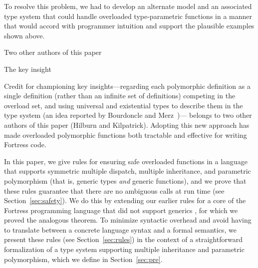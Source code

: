 To resolve this problem, 
we had to develop an alternate model 
and an associated type system 
that could handle overloaded type-parametric functions 
in a manner that would accord with programmer intuition 
and support the plausible examples shown above.

Two other authors of this paper 


The key insight 


Credit for championing key insights---regarding each polymorphic definition
as a single definition (rather than an infinite set of definitions)
competing in the overload set, and using universal and existential types
to describe them in the type system (an idea reported by
Bourdoncle and Merz~\cite{bourdoncle97})---%
belongs to two other authors of this paper (Hilburn and Kilpatrick).
Adopting this new approach has made
overloaded polymorphic functions both tractable and effective
for writing Fortress code.

In this paper, 
we give rules for ensuring safe overloaded functions 
in a language that supports symmetric multiple dispatch, 
multiple inheritance, and parametric polymorphism 
(that is, generic types \emph{and} generic functions),
and we prove that these rules guarantee 
that there are no ambiguous calls at run time 
(see Section~\ref{sec:safety}).
We do this by extending our earlier rules 
for a core of the Fortress programming language 
that did not support generics \cite{allen07,Fortress},
for which we proved the analogous theorem.
To minimize syntactic overhead 
and avoid having to translate 
between a concrete language syntax 
and a formal semantics, 
we present these rules (see Section~\ref{sec:rules}) 
in the context of a straightforward formalization 
of a type system supporting multiple inheritance 
and parametric polymorphism, 
which we define in Section~\ref{sec:pre}.

